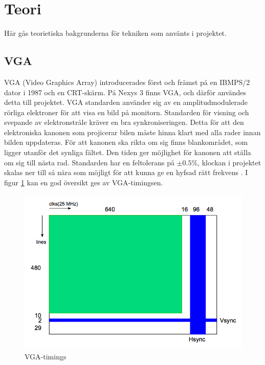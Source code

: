\section{Teori}
	Här gås teorietiska bakgrunderna för tekniken som använts i projektet.

\subsection{VGA}
	VGA (Video Graphics Array) introducerades först och främst på en IBM\circledR PS/2 dator i 1987 och en CRT-skärm. På Nexys 3 finns VGA, och därför användes detta till projektet. VGA standarden använder sig av en amplitudmodulerade rörliga elektroner för att visa en bild på monitorn. Standarden för visning och svepande av elektronstråle kräver en bra synkroniseringen. Detta för att den elektroniska kanonen som projicerar bilen måste hinna klart med alla rader innan bilden uppdateras. För att kanonen ska rikta om sig finns blankområdet, som ligger utanför det synliga fältet. Den tiden ger möjlighet för kanonen att ställa om sig till nästa rad. 
	Standarden har en feltolerans på $\pm0.5\%$, klockan i projektet skalas ner till så nära som möjligt för att kunna ge en hyfsad rätt frekvens \cite{vgasite}. I figur \ref{fig:vgateori} kan en god översikt ges av VGA-timingsen.


	\begin{center}
		\begin{figure}[H]
    		\centering
			\includegraphics[scale=0.50]{../grafik/rapport-vgateori.png}
			\caption{VGA-timings \cite{vgapic}}
			\label{fig:vgateori}
		\end{figure}
	\end{center}



